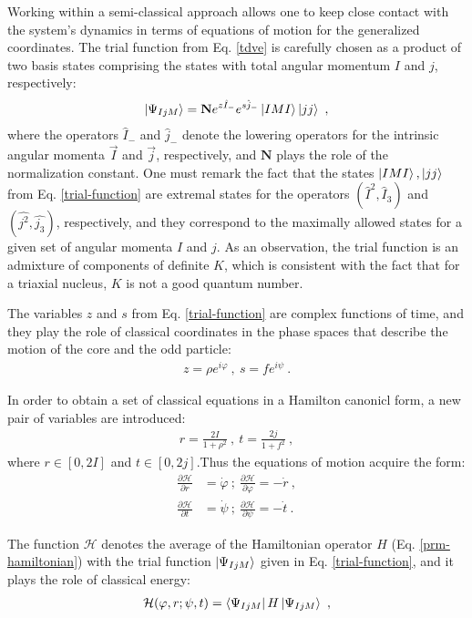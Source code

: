 \documentclass[11pt]{article}
\begin{document}
Working within a semi-classical approach allows one to keep close contact with the system's dynamics in terms of equations of motion for the generalized coordinates. The trial function from Eq. \ref{tdve} is carefully chosen as a product of two basis states comprising the states with total angular momentum $I$ and $j$, respectively:
\begin{align}
    \ket{\Psi_{IjM}}=\mathbf{N}e^{z\hat{I}_-}e^{s\hat{j}_-}\ket{IMI}\ket{jj}\ ,
    \label{trial-function}
\end{align}
where the operators $\hat{I}_-$ and $\hat{j}_-$ denote the lowering operators for the intrinsic angular momenta $\vec{I}$ and $\vec{j}$, respectively, and $\mathbf{N}$ plays the role of the normalization constant. One must remark the fact that the states $\ket{IMI}, \ket{jj}$ from Eq. \ref{trial-function} are extremal states for the operators $(\hat{I}^2,\hat{I}_3)$ and $(\hat{j^2},\hat{j_3})$, respectively, and they correspond to the maximally allowed states for a given set of angular momenta $I$ and $j$. As an observation, the trial function is an admixture of components of definite $K$, which is consistent with the fact that for a triaxial nucleus, $K$ is not a good quantum number.

The variables $z$ and $s$ from Eq. \ref{trial-function} are complex functions of time, and they play the role of classical coordinates in the phase spaces that describe the motion of the core and the odd particle:
\begin{align}
    z=\rho e^{i\varphi}\ ,\ s=fe^{i\psi}\ .
    \label{complex-variable-set}
\end{align}

In order to obtain a set of classical equations in a Hamilton canonicl form, a new pair of variables are introduced: 
\begin{align}
    r=\frac{2I}{1+\rho^2}\ ,\ t=\frac{2j}{1+f^2}\ ,
\end{align}
where $r\in\left[0,2I\right]$ and $t\in\left[0,2j\right]$.Thus the equations of motion acquire the form:
\begin{align}
    \frac{\partial\mathcal{H}}{\partial r}&=\dot{\varphi}\ ;\ \frac{\partial\mathcal{H}}{\partial \varphi}=-\dot{r}\ , \nonumber\\
    \frac{\partial\mathcal{H}}{\partial t}&=\dot{\psi}\ ;\ \frac{\partial\mathcal{H}}{\partial \psi}=-\dot{t}\ .
    \label{eq-motion}
\end{align}

The function $\mathcal{H}$ denotes the average of the Hamiltonian operator $H$ (Eq. \ref{prm-hamiltonian}) with the trial function $\ket{\Psi_{IjM}}$ given in Eq. \ref{trial-function}, and it plays the role of classical energy:
\begin{align}
    \mathcal{H}(\varphi,r;\psi,t)=\bra{\Psi_{IjM}}H\ket{\Psi_{IjM}}\ ,
\end{align}
\end{document}
